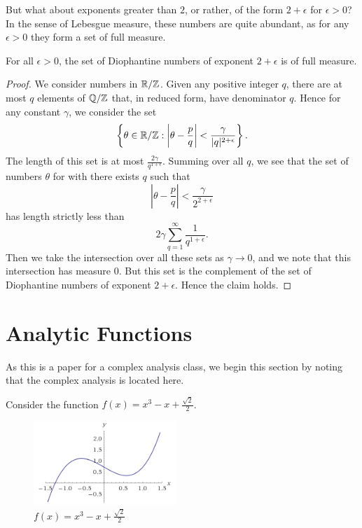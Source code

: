 \documentclass[twoside,letterpaper,10pt]{article}
\begin{document}
But what about exponents greater than $2$, or rather, of the form $2 + \epsilon$
for $\epsilon > 0$?
In the sense of Lebesgue measure, these numbers are quite abundant, as for any
$\epsilon > 0$ they form a set of full measure.
\begin{prop}
  For all $\epsilon > 0$, the set of Diophantine numbers of exponent $2 +
  \epsilon$ is of full measure.
\end{prop}
\begin{proof}
  We consider numbers in $\mathbb{R} / \mathbb{Z}$.
  Given any positive integer $q$, there are at most $q$ elements of $\mathbb{Q} / \mathbb{Z}$
  that, in reduced form, have denominator $q$.
  Hence for any constant $\gamma$, we consider the set
  \begin{equation*}
    \left\{ \theta \in \mathbb{R} / \mathbb{Z} : \left| \theta - \frac{p}{q} \right| <
      \frac{\gamma}{|q|^{2 + \epsilon}} \right\}.
  \end{equation*}
  The length of this set is at most $\frac{2\gamma}{q^{1 + \epsilon}}$.
  Summing over all $q$, we see that the set of numbers $\theta$ for with there
  exists $q$ such that
  \begin{equation*}
    \left| \theta - \frac{p}{q} \right| < \frac{\gamma}{2^{2 + \epsilon}}
  \end{equation*}
  has length strictly less than
  \begin{equation*}
    2 \gamma \sum_{q = 1}^{\infty} \frac{1}{q^{1 + \epsilon}}.
  \end{equation*}
  Then we take the intersection over all these sets as $\gamma \to 0$, and we
  note that this intersection has measure $0$.
  But this set is the complement of the set of Diophantine numbers of exponent
  $2 + \epsilon$.
  Hence the claim holds.
\end{proof}


\section{Analytic Functions}
\label{sec:analytic-functions}

As this is a paper for a complex analysis class, we begin this section by noting
that the complex analysis is located here.

Consider the function $f(x) = x^3 - x + \frac{\sqrt{2}}{2}$.
\begin{figure}
  \begin{center}
    \includegraphics[width=0.48\textwidth]{newtonfail}
  \end{center}
  \caption{$f(x) = x^3 - x + \frac{\sqrt{2}}{2}$}
\end{figure}
\end{document}
